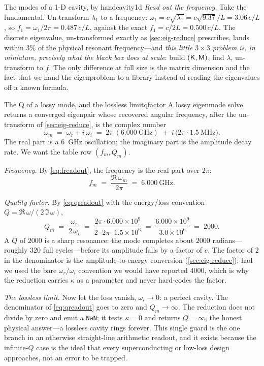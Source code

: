 \begin{workedexample}{The modes of a 1-D cavity, by hand}{cavity1d}
\emph{Read out the frequency.} Take the fundamental. Un-transform
$\lambda_1$ to a frequency: $\omega_1=c\sqrt{\lambda_1}=c\sqrt{9.37}/L=3.06\,c/L$,
so $f_1=\omega_1/2\pi=0.487\,c/L$, against the exact $f_1=c/2L=0.500\,c/L$. The
discrete eigenvalue, un-transformed exactly as \cref{sec:eig-reduce} prescribes,
lands within $3\%$ of the physical resonant frequency---and \emph{this little
$3\times3$ problem is, in miniature, precisely what the black box does at scale}:
build $(\mathsf{K},\mathsf{M})$, find $\lambda$, un-transform to $f$. The only difference at
full size is the matrix dimension and the fact that we hand the eigenproblem to a
library instead of reading the eigenvalues off a known formula.
\end{workedexample}

\begin{workedexample}{The Q of a lossy mode, and the lossless limit}{qfactor}
A lossy eigenmode solve returns a converged eigenpair whose recovered angular
frequency, after the un-transform of \cref{sec:eig-reduce}, is the complex number
\[
  \omega_m \;=\; \omega_r + i\,\omega_i
            \;=\; 2\pi\,(\SI{6.000}{\giga\hertz}) \;+\; i\,\bigl(2\pi\cdot\SI{1.5}{\mega\hertz}\bigr).
\]
The real part is a \SI{6}{\giga\hertz} oscillation; the imaginary part is the
amplitude decay rate. We want the table row $(f_m, Q_m)$.

\emph{Frequency.} By \cref{eq:freadout}, the frequency is the real part over
$2\pi$:
\[
  f_m \;=\; \frac{\Re\,\omega_m}{2\pi} \;=\; \SI{6.000}{\giga\hertz}.
\]

\emph{Quality factor.} By \cref{eq:qreadout} with the energy/loss convention
$Q=\Re\,\omega/(2\,\Im\,\omega)$,
\[
  Q_m \;=\; \frac{\omega_r}{2\,\omega_i}
        \;=\; \frac{2\pi\cdot 6.000\times 10^{9}}{2\cdot 2\pi\cdot 1.5\times 10^{6}}
        \;=\; \frac{6.000\times 10^{9}}{3.0\times 10^{6}}
        \;=\; 2000 .
\]
A $Q$ of $2000$ is a sharp resonance: the mode completes about $2000$
radians---roughly $320$ full cycles---before its amplitude falls by a factor of
$e$. The factor of $2$ in the denominator is the amplitude-to-energy conversion
(\cref{sec:eig-reduce}); had we used the bare $\omega_r/\omega_i$ convention we
would have reported $4000$, which is why the reduction carries $\kappa$ as a
parameter and never hard-codes the factor.

\emph{The lossless limit.} Now let the loss vanish, $\omega_i\to 0$: a perfect
cavity. The denominator of \cref{eq:qreadout} goes to zero and $Q_m\to\infty$.
The reduction does not divide by zero and emit a \texttt{NaN}; it tests
$\kappa=0$ and returns $Q=\infty$, the honest physical answer---a lossless cavity
rings forever. This single guard is the one branch in an otherwise straight-line
arithmetic readout, and it exists because the infinite-$Q$ case is the ideal that
every superconducting or low-loss design approaches, not an error to be trapped.
\end{workedexample}

